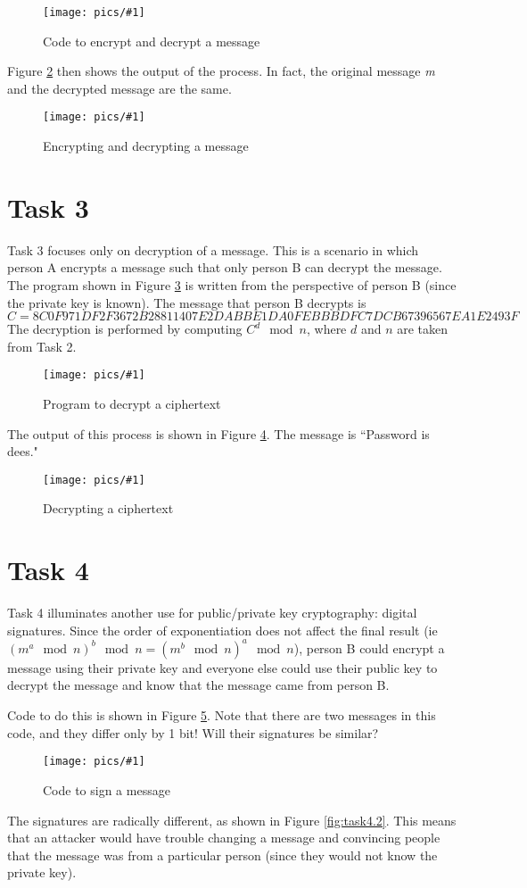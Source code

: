 \documentclass[11pt]{article}
\newcommand{\fig}[2]{ 
\begin{figure}[h]
	\centering
	\caption{#2}
	\texttt{[image: pics/\#1]}
	\label{fig:#1}
\end{figure} 
}
\begin{document}
\fig{task2.1}{Code to encrypt and decrypt a message}

Figure \ref{fig:task2.2} then shows the output of the process. In fact, the original message \textit{m} and the decrypted message are the same.

\fig{task2.2}{Encrypting and decrypting a message}

\newpage
\section*{Task 3}

Task 3 focuses only on decryption of a message. This is a scenario in which person A encrypts a message such that only person B can decrypt the message. The program shown in Figure \ref{fig:task3.1} is written from the perspective of person B (since the private key is known). The message that person B decrypts is 
$$ C = 8C0F971DF2F3672B28811407E2DABBE1DA0FEBBBDFC7DCB67396567EA1E2493F $$
The decryption is performed by computing $ C^d \mod n$, where $d$ and $n$ are taken from Task 2.

\fig{task3.1}{Program to decrypt a ciphertext}

The output of this process is shown in Figure \ref{fig:task3.2}. The message is ``Password is dees."

\fig{task3.2}{Decrypting a ciphertext}

\newpage
\section*{Task 4}

Task 4 illuminates another use for public/private key cryptography: digital signatures. Since the order of exponentiation does not affect the final result (ie $(m^a \mod n)^b \mod n = (m^b \mod n)^a \mod n$), person B could encrypt a message using their private key and everyone else could use their public key to decrypt the message and know that the message came from person B.

Code to do this is shown in Figure \ref{fig:task4.1}. Note that there are two messages in this code, and they differ only by 1 bit! Will their signatures be similar?

\fig{task4.1}{Code to sign a message}

The signatures are radically different, as shown in Figure \ref{fig:task4.2}. This means that an attacker would have trouble changing a message and convincing people that the message was from a particular person (since they would not know the private key).
\end{document}
